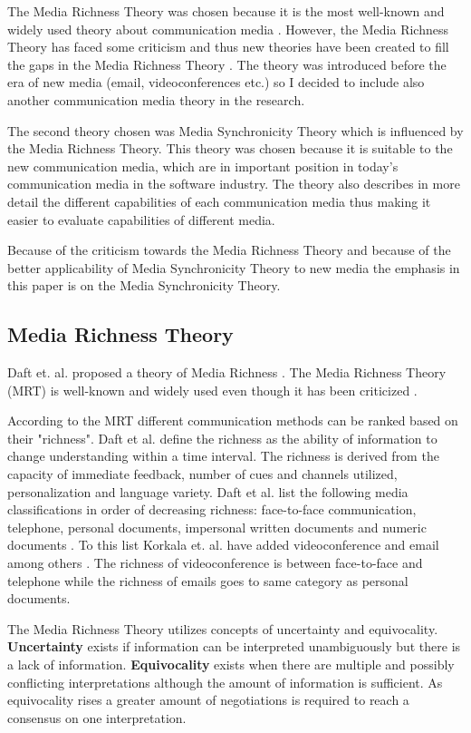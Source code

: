 \documentclass[conference]{IEEEtran}
\begin{document}
The Media Richness Theory was chosen because it is the most well-known and widely used theory about communication media \cite{1986daft}\cite{2006korkala}. However, the Media Richness Theory has faced some criticism and thus new theories have been created to fill the gaps in the Media Richness Theory \cite{1999dennis}. The theory was introduced before the era of new media (email, videoconferences etc.) so I decided to include also another communication media theory in the research.

The second theory chosen was Media Synchronicity Theory which is influenced by the Media Richness Theory. This theory was chosen because it is suitable to the new communication media, which are in important position in today's communication media in the software industry. The theory also describes in more detail the different capabilities of each communication media thus making it easier to evaluate capabilities of different media.

Because of the criticism towards the Media Richness Theory and because of the better applicability of Media Synchronicity Theory to new media the emphasis in this paper is on the Media Synchronicity Theory.

\subsection{Media Richness Theory}

Daft et. al. proposed a theory of Media Richness \cite{1986daft}. The Media Richness Theory (MRT) is well-known and widely used even though it has been criticized \cite{2006korkala} \cite{1999dennis}. 

According to the MRT different communication methods can be ranked based on their "richness". Daft et al. define the richness as the ability of information to change understanding within a time interval. The richness is derived from the capacity of immediate feedback, number of cues and channels utilized, personalization and language variety. Daft et al. list the following media classifications in order of decreasing richness: face-to-face communication, telephone, personal documents, impersonal written documents and numeric documents \cite{1986daft}. To this list Korkala et. al. have added videoconference and email among others \cite{2006korkala}. The richness of videoconference is between face-to-face and telephone while the richness of emails goes to same category as personal documents.

The Media Richness Theory utilizes concepts of uncertainty and equivocality. \textbf{Uncertainty} exists if information can be interpreted unambiguously but there is a lack of information. \textbf{Equivocality} exists when there are multiple and possibly conflicting interpretations although the amount of information is sufficient. As equivocality rises a greater amount of negotiations is required to reach a consensus on one interpretation. \cite{1999dennis}
\end{document}

